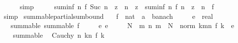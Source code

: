 \begin{isabellebody}
\ \ \ \ \isamarkupfalse%
\ simp\isanewline
\ \ \isamarkupfalse%
\ \isamarkupfalse%
\ {\isachardoublequoteopen}suminf\ {\isacharparenleft}{\kern0pt}{\isasymlambda}n{\isachardot}{\kern0pt}\ f\ {\isacharparenleft}{\kern0pt}Suc\ n{\isacharparenright}{\kern0pt}\ {\isacharasterisk}{\kern0pt}\ z\ {\isacharcircum}{\kern0pt}\ n{\isacharparenright}{\kern0pt}\ {\isacharasterisk}{\kern0pt}\ z\ {\isacharequal}{\kern0pt}\ suminf\ {\isacharparenleft}{\kern0pt}{\isasymlambda}n{\isachardot}{\kern0pt}\ f\ n\ {\isacharasterisk}{\kern0pt}\ z\ {\isacharcircum}{\kern0pt}\ n{\isacharparenright}{\kern0pt}\ {\isacharminus}{\kern0pt}\ f\ {}{\isachardoublequoteclose}\isanewline
\ \ \ \ \isamarkupfalse%
\ simp\isanewline
{}\isamarkupfalse%
%
\endisatagproof
{\isafoldproof}%
%
\isadelimproof
\isanewline
%
\endisadelimproof
\isanewline
{}\isamarkupfalse%
\ summable{\isacharunderscore}{\kern0pt}partial{\isacharunderscore}{\kern0pt}sum{\isacharunderscore}{\kern0pt}bound{\isacharcolon}{\kern0pt}\isanewline
\ \ \ f\ {\isacharcolon}{\kern0pt}{\isacharcolon}{\kern0pt}\ {\isachardoublequoteopen}nat\ {\isasymRightarrow}\ {\isacharprime}{\kern0pt}a\ {\isacharcolon}{\kern0pt}{\isacharcolon}{\kern0pt}\ banach{\isachardoublequoteclose}\isanewline
\ \ \ \ \ e\ {\isacharcolon}{\kern0pt}{\isacharcolon}{\kern0pt}\ real\isanewline
\ \ \ summable{\isacharcolon}{\kern0pt}\ {\isachardoublequoteopen}summable\ f{\isachardoublequoteclose}\isanewline
\ \ \ \ \ e{\isacharcolon}{\kern0pt}\ {\isachardoublequoteopen}e\ {\isachargreater}{\kern0pt}\ {}{\isachardoublequoteclose}\isanewline
\ \ \ N\ \ {\isachardoublequoteopen}{\isasymAnd}m\ n{\isachardot}{\kern0pt}\ m\ {\isasymge}\ N\ {\isasymLongrightarrow}\ norm\ {\isacharparenleft}{\kern0pt}{\isasymSum}k{\isacharequal}{\kern0pt}m{\isachardot}{\kern0pt}{\isachardot}{\kern0pt}n{\isachardot}{\kern0pt}\ f\ k{\isacharparenright}{\kern0pt}\ {\isacharless}{\kern0pt}\ e{\isachardoublequoteclose}\isanewline
%
\isadelimproof
%
\endisadelimproof
%
\isatagproof
{}\isamarkupfalse%
\ {\isacharminus}{\kern0pt}\isanewline
\ \ \isamarkupfalse%
\ summable\ \isamarkupfalse%
\ {\isachardoublequoteopen}Cauchy\ {\isacharparenleft}{\kern0pt}{\isasymlambda}n{\isachardot}{\kern0pt}\ {\isasymSum}k{\isacharless}{\kern0pt}n{\isachardot}{\kern0pt}\ f\ k{\isacharparenright}{\kern0pt}{\isachardoublequoteclose}\isanewline

\end{isabellebody}
